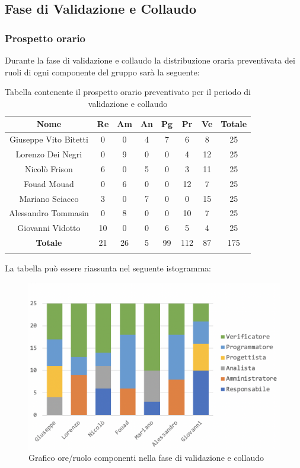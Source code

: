 		\subsection{Fase di Validazione e Collaudo}
		\subsubsection{Prospetto orario}
		Durante la fase di validazione e collaudo la distribuzione oraria preventivata dei ruoli di ogni componente del gruppo sarà la seguente:
		
		\begin{longtable}{|c|c|c|c|c|c|c|c|}
			\hline
			\rowcolor{lighter-grayer}
			\textbf{Nome} & \textbf{Re} & \textbf{Am} & \textbf{An} & \textbf{Pg}  & \textbf{Pr}   & \textbf{Ve} & \textbf{Totale} \\
			\hline
			\endfirsthead
			
			\hline
			Giuseppe Vito Bitetti 		& 0 & 0 & 4 & 7 & 6 & 8 & 25\\
			\hline
			\hline
			Lorenzo Dei Negri			& 0 & 9 & 0 & 0 & 4 & 12 & 25\\
			\hline
			\hline
			Nicolò Frison				    & 6 & 0 & 5 & 0 & 3 & 11 & 25\\
			\hline
			\hline
			Fouad Mouad 				 & 0 & 6 & 0 & 0 & 12 & 7 & 25\\
			\hline
			\hline
			Mariano Sciacco 			& 3 & 0 & 7 & 0 & 0 & 15 & 25\\
			\hline
			\hline
			Alessandro Tommasin    & 0 & 8 & 0 & 0 & 10 & 7 & 25\\
			\hline
			\hline
			Giovanni Vidotto 			 & 10 & 0 & 0 & 6 & 5 & 4 & 25\\
			\hline 
			\textbf{Totale}			 & 21 &  26 & 5 & 99 & 112 & 87 & 175\\
			\hline
			\caption{Tabella contenente il prospetto orario preventivato per il periodo di validazione e collaudo}
		\end{longtable}
		\pagebreak
		
		La tabella può essere riassunta nel seguente istogramma:
		\begin{figure}[H]
			\centering
			\includegraphics[width=0.8\linewidth]{./images/validColl1.png}
			\caption{Grafico ore/ruolo componenti nella fase di validazione e collaudo}
			\label{fig:grafico suddivione ruoli fase validazione e collaudo}
		\end{figure}
	
